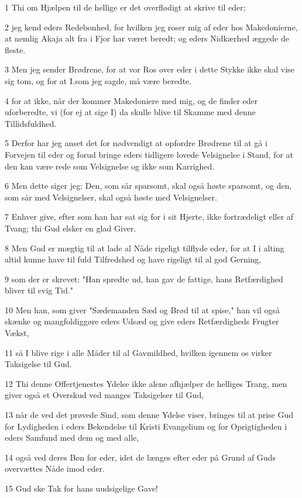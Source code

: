\par 1 Thi om Hjælpen til de hellige er det overflødigt at skrive til eder;
\par 2 jeg kend eders Redebonhed, for hvilken jeg roser mig af eder hos Makedonierne, at nemlig Akaja alt fra i Fjor har været beredt; og eders Nidkærhed æggede de fleste.
\par 3 Men jeg sender Brødrene, for at vor Ros over eder i dette Stykke ikke skal vise sig tom, og for at I.som jeg sagde, må være beredte.
\par 4 for at ikke, når der kommer Makedoniere med mig, og de finder eder uforberedte, vi (for ej at sige I) da skulle blive til Skamme med denne Tillidsfuldhed.
\par 5 Derfor har jeg anset det for nødvendigt at opfordre Brødrene til at gå i Forvejen til eder og forud bringe eders tidligere lovede Velsignelse i Stand, for at den kan være rede som Velsignelse og ikke som Karrighed.
\par 6 Men dette siger jeg: Den, som sår sparsomt, skal også høste sparsomt, og den, som sår med Velsignelser, skal også høste med Velsignelser.
\par 7 Enhver give, efter som han har sat sig for i sit Hjerte, ikke fortrædeligt eller af Tvang; thi Gud elsker en glad Giver.
\par 8 Men Gud er mægtig til at lade al Nåde rigeligt tilflyde eder, for at I i alting altid kunne have til fuld Tilfredshed og have rigeligt til al god Gerning,
\par 9 som der er skrevet: "Han spredte ud, han gav de fattige, hans Retfærdighed bliver til evig Tid."
\par 10 Men han, som giver "Sædemanden Sæd og Brød til at spise," han vil også skænke og mangfoldiggøre eders Udsæd og give eders Retfærdigheds Frugter Vækst,
\par 11 så I blive rige i alle Måder til al Gavmildhed, hvilken igennem os virker Taksigelse til Gud.
\par 12 Thi denne Offertjenestes Ydelse ikke alene afhjælper de helliges Trang, men giver også et Overskud ved manges Taksigelser til Gud,
\par 13 når de ved det prøvede Sind, som denne Ydelse viser, bringes til at prise Gud for Lydigheden i eders Bekendelse til Kristi Evangelium og for Oprigtigheden i eders Samfund med dem og med alle,
\par 14 også ved deres Bøn for eder, idet de længes efter eder på Grund af Guds overvættes Nåde imod eder.
\par 15 Gud ske Tak for hans uudsigelige Gave!

